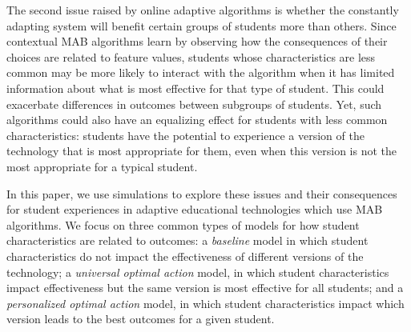 The second issue raised by online adaptive algorithms is whether the constantly adapting system will benefit certain groups of students more than others.
Since contextual MAB algorithms learn by observing how the consequences of their choices are related to feature values, students whose characteristics are less common may be more likely to interact with the algorithm when it has limited information about what is most effective for that type of student. This could exacerbate differences in outcomes between subgroups of students. Yet, such algorithms could also have an equalizing effect for students with less common characteristics: students have the potential to experience a version of the technology that is most appropriate for them, even when this version is not the most appropriate for a typical student.

In this paper, we use simulations to explore these issues and their consequences for student experiences in adaptive educational technologies which use MAB algorithms. We focus on three common types of models for how student characteristics are related to outcomes: a \textit{baseline} model in which student characteristics do not impact the effectiveness of different versions of the technology; a \textit{universal optimal action} model, in which student characteristics impact effectiveness but the same version is most effective for all students; and a \textit{personalized optimal action} model, in which student characteristics impact which version leads to the best outcomes for a given student. 

